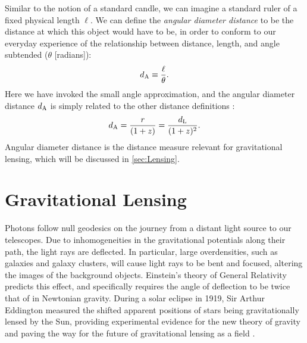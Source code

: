 Similar to the notion of a standard candle, we can imagine a standard ruler of a fixed physical length $\ell$. We can define the {\it angular diameter distance} to be the distance at which this object would have to be, in order to conform to our everyday experience of the relationship between distance, length, and angle subtended ($\theta$ [radians]):
\begin{equation}
d_{\rm A} \equiv \frac{\ell}{\theta}.
\end{equation}
Here we have invoked the small angle approximation, and the angular diameter distance $d_{\rm A}$ is simply related to the other distance definitions \citep{RydenText}:
\begin{equation}
d_{\rm A} = \frac{r}{(1+z)}= \frac{d_{\rm L}}{(1+z)^2}.
\end{equation}
Angular diameter distance is the distance measure relevant for gravitational lensing, which will be discussed in \autoref{sec:Lensing}.

\section{Gravitational Lensing}
\label{sec:Lensing}

Photons follow null geodesics on the journey from a distant light source to our telescopes. Due to inhomogeneities in the gravitational potentials along their path, the light rays are deflected. In particular, large overdensities, such as galaxies and galaxy clusters, will cause light rays to be bent and focused, altering the images of the background objects. Einstein's theory of General Relativity predicts this effect, and specifically requires the angle of deflection to be twice that of in Newtonian gravity. During a solar eclipse in 1919, Sir Arthur Eddington measured the shifted apparent positions of stars being gravitationally lensed by the Sun, providing experimental evidence for the new theory of gravity and paving the way for the future of gravitational lensing as a field \citep[e.g.][\textcolor{red}{and other lensing reviews}]{BS01}.

